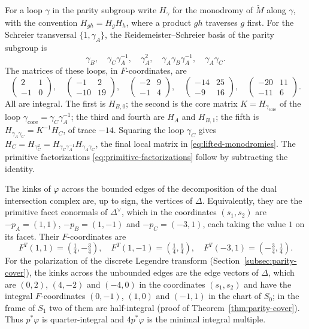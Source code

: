 For a loop $\gamma$ in the parity subgroup write $H_\gamma$ for the
monodromy of $\widetilde M$ along $\gamma$, with the convention
$H_{gh}=H_gH_h$, where a product $gh$ traverses $g$ first.  For the Schreier
transversal $\{1,\gamma_A\}$, the Reidemeister--Schreier basis of the parity
subgroup is
\[
 \gamma_B,\quad \gamma_C\gamma_A^{-1},\quad \gamma_A^2,\quad
 \gamma_A\gamma_B\gamma_A^{-1},\quad \gamma_A\gamma_C.
\]
The matrices of these loops, in $F$-coordinates, are
\begin{equation}\label{eq:parity-matrices}
 \begin{pmatrix}2&1\\-1&0\end{pmatrix},\quad
 \begin{pmatrix}-1&2\\-10&19\end{pmatrix},\quad
 \begin{pmatrix}-2&9\\-1&4\end{pmatrix},\quad
 \begin{pmatrix}-14&25\\-9&16\end{pmatrix},\quad
 \begin{pmatrix}-20&11\\-11&6\end{pmatrix}.
\end{equation}
All are integral.  The first is $H_{B,0}$; the second is the core matrix
$K=H_{\gamma_{\mathrm{core}}}$ of the loop
$\gamma_{\mathrm{core}}=\gamma_C\gamma_A^{-1}$; the third and fourth are
$H_A$ and $H_{B,1}$; the fifth is $H_{\gamma_A\gamma_C}=K^{-1}H_C$, of
trace $-14$.  Squaring the loop $\gamma_C$ gives
$H_C=H_{\gamma_C^2}=H_{\gamma_C\gamma_A^{-1}}H_{\gamma_A\gamma_C}$, the
final local matrix in \eqref{eq:lifted-monodromies}.  The primitive
factorizations \eqref{eq:primitive-factorizations} follow by subtracting the
identity.

The kinks of $\varphi$ across the bounded edges of the decomposition of
the dual intersection complex are, up to sign, the vertices of $\Delta$.  Equivalently, they
are the primitive facet conormals of $\Delta^\vee$, which in the coordinates
$(s_1,s_2)$ are $-p_A=(1,1)$, $-p_B=(1,-1)$ and $-p_C=(-3,1)$, each taking
the value $1$ on its facet.  Their $F$-coordinates are
\begin{equation}\label{eq:polarization-conormals}
 F^T(1,1)=(\tfrac14,-\tfrac34),\quad
 F^T(1,-1)=(\tfrac14,\tfrac14),\quad
 F^T(-3,1)=(-\tfrac34,\tfrac14).
\end{equation}
For the polarization of the discrete Legendre transform
(Section~\ref{subsec:parity-cover}), the kinks across the unbounded edges
are the edge vectors of $\Delta$, which
are $(0,2)$, $(4,-2)$ and $(-4,0)$ in the coordinates $(s_1,s_2)$ and have
the integral $F$-coordinates $(0,-1)$, $(1,0)$ and $(-1,1)$ in the chart of
$S_0$; in the frame of $S_1$ two of them are half-integral (proof of
Theorem~\ref{thm:parity-cover}).  Thus $p^*\varphi$ is quarter-integral and
$4p^*\varphi$ is the minimal integral multiple.

